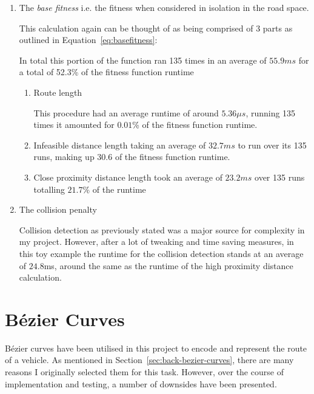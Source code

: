 \begin{enumerate}
  \item The \textit{base fitness} i.e. the fitness when considered in isolation in the road space.

        This calculation again can be thought of as being comprised of 3 parts as outlined in Equation~\ref{eq:basefitness}:

        In total this portion of the function ran 135 times in an average of $55.9ms$ for a total of 52.3\% of the fitness function runtime

        \begin{enumerate}
          \item Route length

                This procedure had an average runtime of around $5.36\mu s$, running 135 times it amounted for $0.01$\% of the fitness function runtime.

          \item Infeasible distance length taking an average of $32.7ms$ to run over its 135 runs, making up $30.6$ of the fitness function runtime.
          \item Close proximity distance length took an average of $23.2ms$ over 135 runs totalling $21.7$\% of the runtime

        \end{enumerate}


  \item The collision penalty

        Collision detection as previously stated was a major source for complexity in my project. However, after a lot of tweaking and time saving measures, in this toy example the runtime for the collision detection stands at an average of $24.8$ms, around the same as the runtime of the high proximity distance calculation.
\end{enumerate}


\section{Bézier Curves}
\label{sec:eval:bezier}

Bézier curves have been utilised in this project to encode and represent the route of a vehicle. As mentioned in Section~\ref{sec:back-bezier-curves}, there are many reasons I originally selected them for this task. However, over the course of implementation and testing, a number of downsides have been presented.

